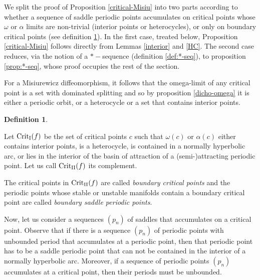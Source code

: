\documentclass[a4paper,11pt]{article}
\theoremstyle{definition}
\newtheorem{definition}[lemma]{Definition}
\begin{document}

We split the proof of Proposition \ref{critical-Misiu} into two parts according to whether  a sequence of saddle periodic points accumulates on critical points whose $\omega$ or 
$\alpha$ limits are non-trivial (interior points or heterocycles), or only on boundary critical points (see definition \ref{defi:boundary}). In the first case, treated below, Proposition \ref{critical-Misiu} follows directly from Lemmas \ref{interior} and \ref{HC}. The second case reduces, via the notion of a  $*-$sequence (definition \ref{def:*-seq}), to proposition \ref{prop:*-seq}, whose proof occupies the rest of the section.






For a  Misiurewicz diffeomorphism, it follows that the  omega-limit of any critical point is a set with dominated splitting and so by proposition \ref{dicho-omega} it is either a periodic orbit, or a heterocycle or a set that contains interior points.



\begin{definition}\label{defi:boundary} 
    
Let ${\rm Crit_I}(f)$ be the set of critical points $c$ such that  $\omega(c)$ or $\alpha(c)$  either contains interior points, is a heterocycle, is contained in a normally hyperbolic arc, or lies in the interior of the basin of attraction of a (semi-)attracting periodic point. Let us call ${\rm Crit_{II}}(f)$ its complement. 

The critical points in ${\rm Crit_{II}}(f)$ are called {\it boundary critical points}  and the periodic points whose stable or unstable manifolds contain a boundary critical point are called {\it boundary saddle periodic points}. 
\end{definition}



Now, let us consider a sequences $(p_n)$ of saddles that accumulates on a critical point. Observe that if there is a sequence $(p_n)$ of periodic points with unbounded period that accumulates at a periodic point, then that periodic point has to be a saddle periodic point that can not be contained in the interior of a normally hyperbolic arc. Moreover, if a sequence of periodic points $(p_n)$ accumulates at a critical point, then their periods must be unbounded.
\end{document}
